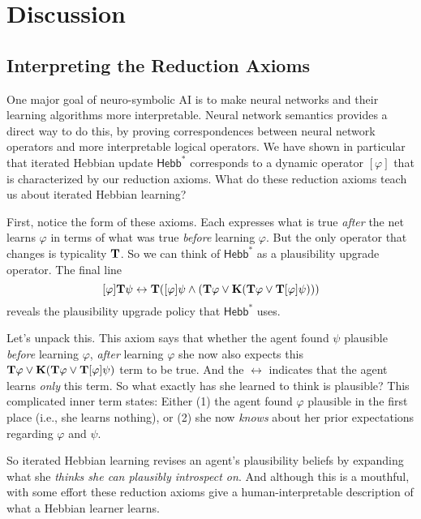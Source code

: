 \documentclass[letterpaper]{article}
\theoremstyle{definition}
\newcommand{\HebbstarNoArgs}{\mathsf{Hebb}^*}
\newcommand{\Typ}[1]{\textrm{\textup{\textbf{T}}} #1}
\newcommand{\Know}[1]{\textrm{\textup{\textbf{K}}} #1}
\newcommand{\Hebbop}[1]{[#1]}
\begin{document}
\section{Discussion}

\subsection{Interpreting the Reduction Axioms}

One major goal of neuro-symbolic AI is to make neural networks and their learning algorithms more interpretable.  Neural network semantics provides a direct way to do this, by proving correspondences between neural network operators and more interpretable logical operators.  We have shown in particular that iterated Hebbian update $\HebbstarNoArgs$ corresponds to a dynamic operator $\Hebbop{\varphi}$ that is characterized by our reduction axioms.  What do these reduction axioms teach us about iterated Hebbian learning?

First, notice the form of these axioms.  Each expresses what is true \emph{after} the net learns $\varphi$ in terms of what was true \emph{before} learning $\varphi$.  But the only operator that changes is typicality $\Typ$.  So we can think of $\HebbstarNoArgs$ as a plausibility upgrade operator.  The final line
\[
    \Hebbop{\varphi} \Typ{\psi} \leftrightarrow 
    \Typ{(\Hebbop{\varphi}\psi \land (\Typ{\varphi \lor \Know{(\Typ{\varphi} \lor \Typ{\Hebbop{\varphi}\psi})}}))}
\]
reveals the plausibility upgrade policy that $\HebbstarNoArgs$ uses.

Let's unpack this.  This axiom says that whether the agent found $\psi$ plausible \emph{before} learning $\varphi$, \emph{after} learning $\varphi$ she now also expects this $\Typ{\varphi \lor \Know{(\Typ{\varphi} \lor \Typ{\Hebbop{\varphi}\psi})}}$ term to be true.  And the $\leftrightarrow$ indicates that the agent learns \emph{only} this term.  So what exactly has she learned to think is plausible?  This complicated inner term states:  Either (1) the agent found $\varphi$ plausible in the first place (i.e., she learns nothing), or (2) she now \emph{knows} about her prior expectations regarding $\varphi$ and $\psi$.

So iterated Hebbian learning revises an agent's plausibility beliefs by expanding what she \emph{thinks she can plausibly introspect on}.  And although this is a mouthful, with some effort these reduction axioms give a human-interpretable description of what a Hebbian learner learns.
\end{document}
